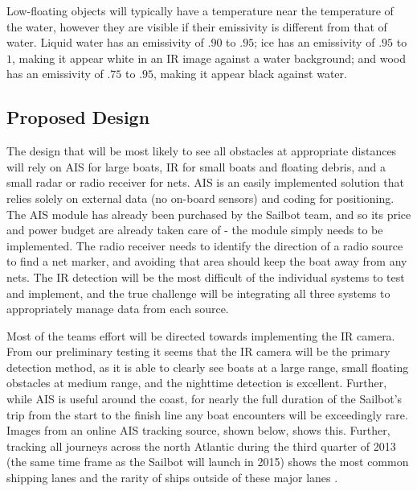 Low-floating objects will typically have a temperature near the temperature of the water, however they are visible if their emissivity is different from that of water. Liquid water has an emissivity of $.90$ to $.95$; ice has an emissivity of $.95$ to $1$, making it appear white in an IR image against a water background; and wood has an emissivity of $.75$ to $.95$, making it appear black against water. \cite{optotherm-emisstable}


\subsection{\label{sec:method:proposed-design}Proposed Design}
The design that will be most likely to see all obstacles at appropriate distances will rely on AIS for large boats, IR for small boats and floating debris, and  a small radar or radio receiver for nets. AIS is an easily implemented solution that relies solely on external data (no on-board sensors) and coding for positioning. The AIS module has already been purchased by the Sailbot team, and so its price and power budget are already taken care of - the module simply needs to be implemented. The radio receiver needs to identify the direction of a radio source to find a net marker, and avoiding that area should keep the boat away from any nets. The IR detection will be the most difficult of the individual systems to test and implement, and the true challenge will be integrating all three systems to appropriately manage data from each source.

Most of the teams effort will be directed towards implementing the IR camera. From our preliminary testing it seems that the IR camera will be the primary detection method, as it is able to clearly see boats at a large range, small floating obstacles at medium range, and the nighttime detection is excellent. Further, while AIS is useful around the coast, for nearly the full duration of the Sailbot's trip from the start to the finish line any boat encounters will be exceedingly rare. Images from an online AIS tracking source, shown below, shows this. Further, tracking all journeys across the north Atlantic during the third quarter of 2013 (the same time frame as the Sailbot will launch in 2015) shows the most common shipping lanes and the rarity of ships outside of these major lanes \cite{marine-traffic}.

